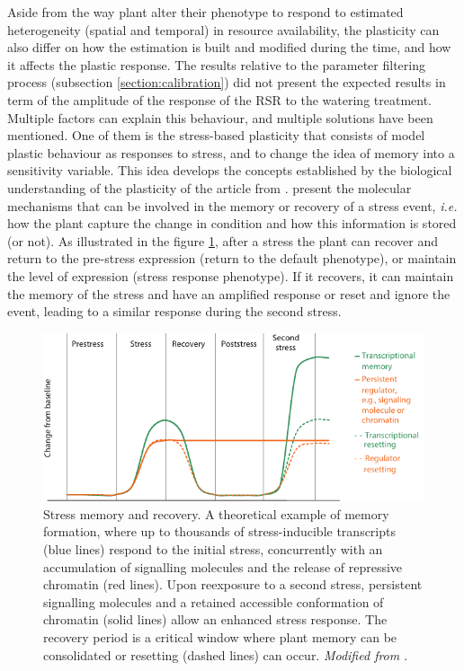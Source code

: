 Aside from the way plant alter their phenotype to respond to estimated heterogeneity (spatial and temporal) in resource availability, the plasticity can also differ on how the estimation is built and modified during the time, and how it affects the plastic response. The results relative to the parameter filtering process (subsection \ref{section:calibration}) did not present the expected results in term of the amplitude of the response of the RSR to the watering treatment. Multiple factors can explain this behaviour, and multiple solutions have been mentioned. One of them is the stress-based plasticity that consists of model plastic behaviour as responses to stress, and to change the idea of memory into a sensitivity variable. This idea develops the concepts established by the biological understanding of the plasticity of the article from \cite{crisp_reconsidering_2016}. \cite{crisp_reconsidering_2016} present the molecular mechanisms that can be involved in the memory or recovery of a stress event, \textit{i.e.} how the plant capture the change in condition and how this information is stored (or not). As illustrated in the figure \ref{fig:stress_memory}, after a stress the plant can recover and return to the pre-stress expression (return to the default phenotype)\parencite{liu_biomass_2004}, or maintain the level of expression (stress response phenotype)\parencite{peterson_growth_1982}. If it recovers, it can maintain the memory of the stress and have an amplified response or reset and ignore the event, leading to a similar response during the second stress.



\begin{figure}\label{fig:stress_memory}
\includegraphics[width = \textwidth]{./2_PP/Figures/Concepts/stress_memory.pdf}
\caption[Stress memory and recovery]{Stress memory and recovery. A theoretical example of memory formation, where up to thousands of stress-inducible transcripts (blue lines) respond to the initial stress, concurrently with an accumulation of signalling molecules and the release of repressive chromatin (red lines). Upon reexposure to a second stress, persistent signalling molecules and a retained accessible conformation of chromatin (solid lines) allow an enhanced stress response. The recovery period is a critical window where plant memory can be consolidated or resetting (dashed lines) can occur. \textit{Modified from \cite{crisp_reconsidering_2016}}.}
\end{figure}

